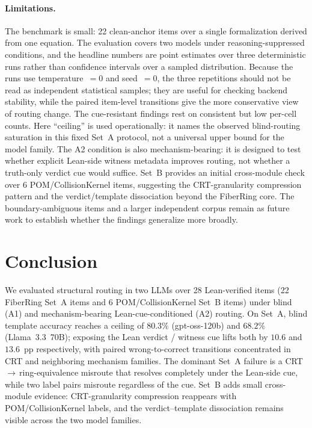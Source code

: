 \documentclass[11pt]{article}
\begin{document}
\paragraph{Limitations.}
The benchmark is small: 22 clean-anchor items over a single formalization
derived from one equation.
The evaluation covers two models under reasoning-suppressed conditions, and
the headline numbers are point estimates over three deterministic runs rather
than confidence intervals over a sampled distribution.
Because the runs use temperature~$=0$ and seed~$=0$, the three repetitions
should not be read as independent statistical samples; they are useful for
checking backend stability, while the paired item-level transitions give the
more conservative view of routing change.
The cue-resistant findings rest on consistent but low per-cell counts.
Here ``ceiling'' is used operationally: it names the observed blind-routing
saturation in this fixed Set~A protocol, not a universal upper bound for the
model family.
The A2 condition is also mechanism-bearing: it is designed to test whether
explicit Lean-side witness metadata improves routing, not whether a truth-only
verdict cue would suffice.
Set~B provides an initial cross-module check over 6 POM/CollisionKernel
items, suggesting the CRT-granularity compression pattern and the
verdict/template dissociation beyond the FiberRing core.
The boundary-ambiguous items and a larger independent corpus remain as
future work to establish whether the findings generalize more broadly.

\section{Conclusion}
\label{sec:conclusion}

We evaluated structural routing in two LLMs over 28 Lean-verified items
(22 FiberRing Set~A items and 6 POM/CollisionKernel Set~B items) under
blind (A1) and mechanism-bearing Lean-cue-conditioned (A2) routing.
On Set~A, blind template accuracy reaches a ceiling of $80.3\%$
(gpt-oss-120b) and $68.2\%$ (Llama~3.3~70B); exposing the Lean verdict /
witness cue lifts both by $10.6$ and $13.6$~pp respectively, with paired
wrong-to-correct transitions concentrated in CRT and neighboring mechanism
families.
The dominant Set~A failure is a CRT\,$\to$\,ring-equivalence misroute that
resolves completely under the Lean-side cue, while two label pairs misroute
regardless of the cue.
Set~B adds small cross-module evidence: CRT-granularity compression reappears
with POM/CollisionKernel labels, and the verdict--template dissociation remains
visible across the two model families.
\end{document}
